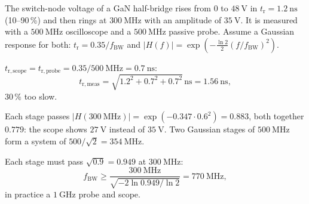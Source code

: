 


The switch-node voltage of a GaN half-bridge rises from 0 to $\SI{48}{\volt}$ in $t_\mathrm{r}=\SI{1.2}{\nano\second}$ (10--90\,\%) and then rings at $\SI{300}{\mega\hertz}$ with an amplitude of $\SI{35}{\volt}$. It is measured with a $\SI{500}{\mega\hertz}$ oscilloscope and a $\SI{500}{\mega\hertz}$ passive probe. Assume a Gaussian response for both: $t_\mathrm{r}=0.35/f_\mathrm{BW}$ and $|H(f)|=\exp\left(-\frac{\ln2}{2}(f/f_\mathrm{BW})^2\right)$.


\begin{solutionblock}
	$t_\mathrm{r,scope}=t_\mathrm{r,probe}=0.35/\SI{500}{\mega\hertz}=\SI{0.7}{\nano\second}$:
	\begin{equation}
		t_\mathrm{r,meas}=\sqrt{1.2^2+0.7^2+0.7^2}\,\si{\nano\second}=\SI{1.56}{\nano\second},
	\end{equation}
	30\,\% too slow.
\end{solutionblock}


\begin{solutionblock}
	Each stage passes $|H(\SI{300}{\mega\hertz})|=\exp(-0.347\cdot0.6^2)=0.883$, both together $0.779$: the scope shows $\SI{27}{\volt}$ instead of $\SI{35}{\volt}$. Two Gaussian stages of $\SI{500}{\mega\hertz}$ form a system of $500/\sqrt{2}=\SI{354}{\mega\hertz}$.
\end{solutionblock}


\begin{solutionblock}
	Each stage must pass $\sqrt{0.9}=0.949$ at $\SI{300}{\mega\hertz}$:
	\begin{equation}
		f_\mathrm{BW}\geq\frac{\SI{300}{\mega\hertz}}{\sqrt{-2\ln0.949/\ln2}}=\SI{770}{\mega\hertz},
	\end{equation}
	in practice a $\SI{1}{\giga\hertz}$ probe and scope.
\end{solutionblock}

